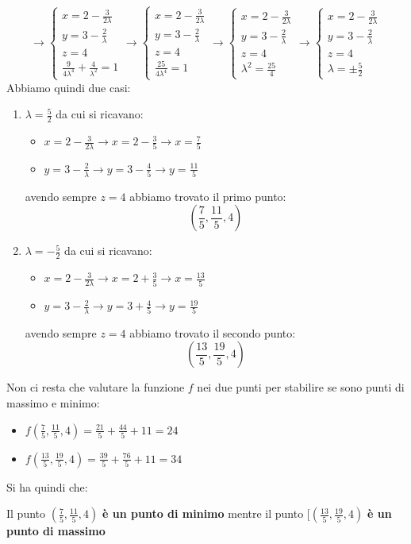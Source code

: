 \documentclass[a4paper,12pt, oneside]{book}
\begin{document}
\[
\to
  \begin{cases}
    x=2-\frac{3}{2\lambda}\\
    y=3-\frac{2}{\lambda}\\
    z=4\\
    \frac{9}{4\lambda^4}+\frac{4}{\lambda^2}=1
  \end{cases}\to
  \begin{cases}
    x=2-\frac{3}{2\lambda}\\
    y=3-\frac{2}{\lambda}\\
    z=4\\
    \frac{25}{4\lambda^4}=1
  \end{cases}\to
  \begin{cases}
    x=2-\frac{3}{2\lambda}\\
    y=3-\frac{2}{\lambda}\\
    z=4\\
    \lambda^2=\frac{25}{4}
  \end{cases}
  \to
  \begin{cases}
    x=2-\frac{3}{2\lambda}\\
    y=3-\frac{2}{\lambda}\\
    z=4\\
    \lambda=\pm\frac{5}{2}
  \end{cases}
\]
\newpage
Abbiamo quindi due casi:
\begin{enumerate}
  \item $\lambda=\frac{5}{2}$ da cui si ricavano:
  \begin{itemize}
    \item $x=2-\frac{3}{2\lambda}\to x=2-\frac{3}{5}\to
    x=\frac{7}{5}$
    \item $y=3-\frac{2}{\lambda}\to y=3-\frac{4}{5}
    \to y=\frac{11}{5}$ 
  \end{itemize}
  avendo sempre $z=4$ abbiamo trovato il primo punto:
  \[\left(\frac{7}{5}, \frac{11}{5}, 4\right)\]
  
  \item $\lambda=-\frac{5}{2}$ da cui si ricavano:
  \begin{itemize}
    \item $x=2-\frac{3}{2\lambda}\to x=2+\frac{3}{5}\to
    x=\frac{13}{5}$
    \item $y=3-\frac{2}{\lambda}\to y=3+\frac{4}{5}
    \to y=\frac{19}{5}$ 
  \end{itemize}
  avendo sempre $z=4$ abbiamo trovato il secondo punto:
  \[\left(\frac{13}{5}, \frac{19}{5}, 4\right)\]
\end{enumerate}
Non ci resta che valutare la funzione $f$ nei due punti per stabilire
se sono punti di massimo e minimo:
\begin{itemize}
  \item $f\left(\frac{7}{5}, \frac{11}{5},
    4\right)=\frac{21}{5}+\frac{44}{5}+11=24$
  \item $f\left(\frac{13}{5}, \frac{19}{5},
    4\right)=\frac{39}{5}+\frac{76}{5}+11=34$
\end{itemize}
Si ha quindi che:
\begin{shaded}
  Il punto $\left(\frac{7}{5}, \frac{11}{5}, 4\right)$ \textbf{è un
    punto di minimo} mentre il punto $[\left(\frac{13}{5}, \frac{19}{5},
    4\right)$ \textbf{è un punto di massimo}
\end{shaded}
\end{document}
